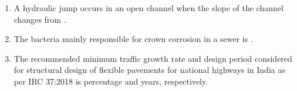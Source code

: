 \documentclass[journal,12pt,onecolumn]{article}
\theoremstyle{remark}
\begin{document}
\begin{enumerate}
    \hfill{}
    \begin{enumerate}
    \end{enumerate}

    \item A hydraulic jump occurs in an open channel when the slope of the channel changes from \underline{\hspace{2cm}}.

    \hfill{}
    \begin{enumerate}
    \end{enumerate}

    \item The bacteria mainly responsible for crown corrosion in a sewer is \underline{\hspace{2cm}}.

    \hfill{}
    \begin{enumerate}
    \end{enumerate}

    \item The recommended minimum traffic growth rate and design period considered for structural design of flexible pavements for national highways in India as per IRC 37:2018 is \underline{\hspace{1cm}} percentage and \underline{\hspace{1cm}} years, respectively.


\end{enumerate}
\end{document}
